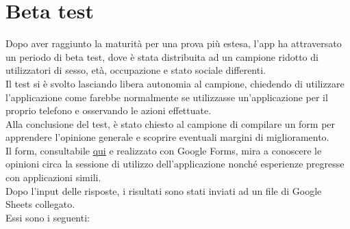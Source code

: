    \section{Beta test}
        Dopo aver raggiunto la maturità per una prova più estesa, l'app ha attraversato un periodo di beta test, dove è stata distribuita ad un campione ridotto di utilizzatori di sesso, età, occupazione e stato sociale differenti. \\
        Il test si è svolto lasciando libera autonomia al campione, chiedendo di utilizzare l'applicazione come farebbe normalmente se utilizzasse un'applicazione per il proprio telefono e osservando le azioni effettuate. \\
        Alla conclusione del test, è stato chiesto al campione di compilare un form per apprendere l'opinione generale e scoprire eventuali margini di miglioramento. \\
        Il form, consultabile \href{https://forms.gle/cmGryaNc8UBN3qct9}{\underline{qui}} e realizzato con Google Forms, mira a conoscere le opinioni circa la sessione di utilizzo dell'applicazione nonché esperienze pregresse con applicazioni simili. \\
        Dopo l'input delle risposte, i risultati sono stati inviati ad un file di Google Sheets collegato. \\
        Essi sono i seguenti:

